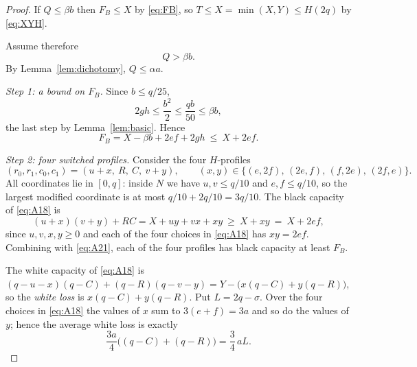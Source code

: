 \documentclass[11pt]{amsart}
\theoremstyle{definition}
\theoremstyle{remark}
\begin{document}
\begin{proof}
If $Q\le\beta b$ then $F_B\le X$ by \eqref{eq:FB}, so $T\le X=\min(X,Y)\le H(2q)$ by \eqref{eq:XYH}.

Assume therefore
\begin{equation}\label{eq:A17}
Q>\beta b .
\end{equation}
By Lemma~\ref{lem:dichotomy}, $Q\le\alpha a$.

\emph{Step 1: a bound on $F_B$.} Since $b\le q/25$,
\begin{equation}\label{eq:A21a}
2gh\le\frac{b^2}{2}\le\frac{qb}{50}\le\beta b ,
\end{equation}
the last step by Lemma~\ref{lem:basic}. Hence
\begin{equation}\label{eq:A21}
F_B=X-\beta b+2ef+2gh\ \le\ X+2ef .
\end{equation}

\emph{Step 2: four switched profiles.} Consider the four $H$-profiles
\begin{equation}\label{eq:A18}
(r_0,r_1,c_0,c_1)=(u+x,\ R,\ C,\ v+y),
\qquad (x,y)\in\bigl\{(e,2f),\,(2e,f),\,(f,2e),\,(2f,e)\bigr\} .
\end{equation}
All coordinates lie in $[0,q]$: inside $N$ we have $u,v\le q/10$ and $e,f\le q/10$, so the largest modified coordinate is at most $q/10+2q/10=3q/10$. The black capacity of \eqref{eq:A18} is
\begin{equation}\label{eq:A20}
(u+x)(v+y)+RC=X+uy+vx+xy\ \ge\ X+xy\ =\ X+2ef ,
\end{equation}
since $u,v,x,y\ge0$ and each of the four choices in \eqref{eq:A18} has $xy=2ef$. Combining with \eqref{eq:A21}, each of the four profiles has black capacity at least $F_B$.

The white capacity of \eqref{eq:A18} is $(q-u-x)(q-C)+(q-R)(q-v-y)=Y-\bigl(x(q-C)+y(q-R)\bigr)$, so the \emph{white loss} is $x(q-C)+y(q-R)$. Put $L=2q-\sigma$. Over the four choices in \eqref{eq:A18} the values of $x$ sum to $3(e+f)=3a$ and so do the values of $y$; hence the average white loss is exactly
\begin{equation}\label{eq:A22}
\frac{3a}{4}\bigl((q-C)+(q-R)\bigr)=\frac34\,aL .
\end{equation}


\end{proof}
\end{document}
